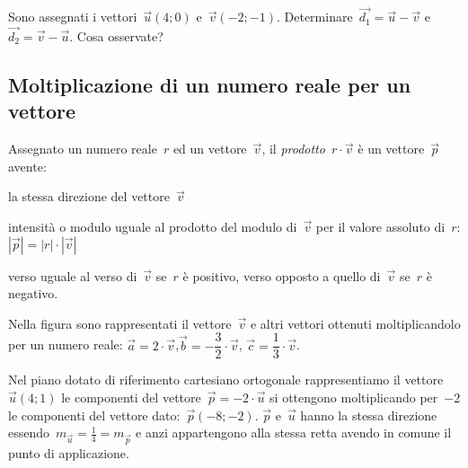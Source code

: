 \begin{exrig}
\begin{esempio}

Sono assegnati i vettori~$\vec{u}(4;0)$ e~$\vec{v}(-2;-1)$. 
Determinare~$\vec{d_1}=\vec{u}-\vec{v}$ e~$\vec{d_2}=\vec{v}-\vec{u}$. Cosa 
osservate?
\begin{center}
 
\end{center}
\end{esempio}
\end{exrig}

\subsection{Moltiplicazione di un numero reale per un vettore}

\begin{definizione}
Assegnato un numero reale~$r$ ed un vettore~$\vec{v}$, il \emph{prodotto}~$r 
\cdot \vec{v}$ è un vettore~$\vec{p}$ avente:
\begin{enumeratea}
\item la stessa direzione del vettore~$\vec{v}$
\item intensità o modulo uguale al prodotto del modulo di~$\vec{v}$ per il 
valore assoluto di~$r$:
 \subitem $|\vec{p}|=|r| \cdot|\vec{v}|$
\item verso uguale al verso di~$\vec{v}$ se~$r$ è positivo, verso opposto a 
quello di~$\vec{v}$ se~$r$ è negativo.
\end{enumeratea}
\end{definizione}

\begin{exrig}
\begin{esempio}
Nella figura sono rappresentati il vettore~$\vec{v}$ e altri vettori ottenuti 
moltiplicandolo per un numero reale:
$\vec{a}=2 \cdot \vec{v}$,$\vec{b}=-\dfrac{3}{2} \cdot \vec{v}$, 
$\vec{c}=\dfrac{1}{3} \cdot \vec{v}$.
\begin{center}
 
\end{center}

\end{esempio}
\begin{esempio}
Nel piano dotato di riferimento cartesiano ortogonale rappresentiamo il 
vettore~$\vec{u}(4;1)$ le componenti
del vettore~$\vec{p}=-2\cdot \vec{u}$ si ottengono moltiplicando per~$-2$ le 
componenti del vettore dato:~$\vec{p}(-8;-2)$. $\vec{p}$ e~$\vec{u}$
hanno la stessa direzione essendo~$m_{\vec{u}}=\frac{1}{4}=m_{\vec{p}}$ e anzi 
appartengono alla stessa retta avendo in comune il punto di applicazione.
\begin{center}
 
\end{center}
\end{esempio}
\end{exrig}

